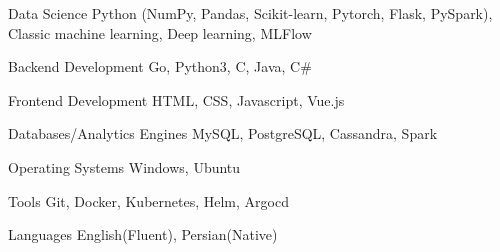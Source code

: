 

\begin{cvskills}

  \cvskill
    {Data Science} %
    {Python (NumPy, Pandas, Scikit-learn, Pytorch, Flask, PySpark), Classic machine learning, Deep learning, MLFlow} %

  \cvskill
    {Backend Development} %
    {Go, Python3, C, Java, C\#} %

  \cvskill
    {Frontend Development} %
    {HTML, CSS, Javascript, Vue.js} %

  \cvskill
    {Databases/Analytics Engines} %
    {MySQL, PostgreSQL, Cassandra, Spark} %

  \cvskill
    {Operating Systems} %
    {Windows, Ubuntu} %

  \cvskill
    {Tools} %
    {Git, Docker, Kubernetes, Helm, Argocd} %

  \cvskill
    {Languages} %
    {English(Fluent), Persian(Native)} %

\end{cvskills}
